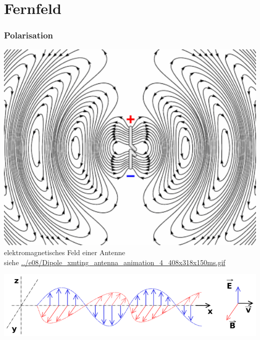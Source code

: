 \section*{Fernfeld}

\begin{frame}
  \frametitle{Polarisation}
  \begin{center}
    \begin{minipage}{0.45\textwidth}
      \includegraphics[width=1\textwidth,height=.6\textheight,keepaspectratio]{e08/Dipole_xmting_antenna_animation_4_408x318x150ms-2.png}\\
      {\tiny elektromagnetisches Feld einer Antenne \\
      siehe \url{../e08/Dipole_xmting_antenna_animation_4_408x318x150ms.gif}}
    \end{minipage}
    \begin{minipage}{0.45\textwidth}
      \includegraphics[width=\textwidth,height=.8\textheight,keepaspectratio]{e08/Onde_electromagnetique.png}\\

\end{minipage}
\end{center}
\end{frame}
